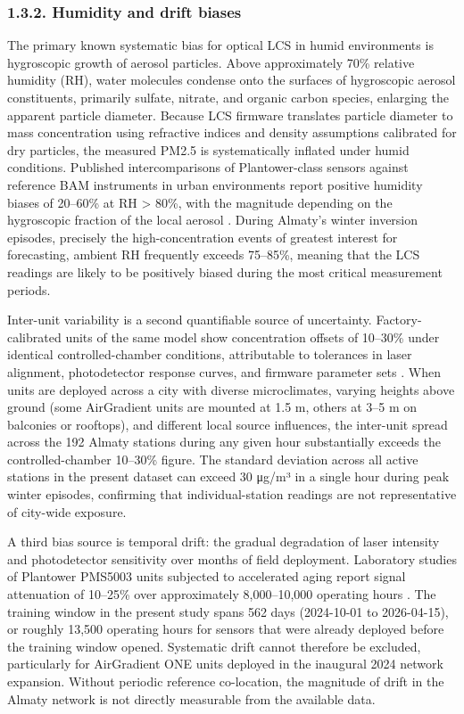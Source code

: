 \subsubsection{1.3.2. Humidity and drift biases}\label{humidity-and-drift-biases}

The primary known systematic bias for optical LCS in humid environments is hygroscopic growth of aerosol particles. Above approximately 70\% relative humidity (RH), water molecules condense onto the surfaces of hygroscopic aerosol constituents, primarily sulfate, nitrate, and organic carbon species, enlarging the apparent particle diameter. Because LCS firmware translates particle diameter to mass concentration using refractive indices and density assumptions calibrated for dry particles, the measured PM2.5 is systematically inflated under humid conditions. Published intercomparisons of Plantower-class sensors against reference BAM instruments in urban environments report positive humidity biases of 20--60\% at RH \textgreater{} 80\%, with the magnitude depending on the hygroscopic fraction of the local aerosol \cite{DiAntonio2018humidity} \cite{Kosmopoulos2020}. During Almaty's winter inversion episodes, precisely the high-concentration events of greatest interest for forecasting, ambient RH frequently exceeds 75--85\%, meaning that the LCS readings are likely to be positively biased during the most critical measurement periods.

Inter-unit variability is a second quantifiable source of uncertainty. Factory-calibrated units of the same model show concentration offsets of 10--30\% under identical controlled-chamber conditions, attributable to tolerances in laser alignment, photodetector response curves, and firmware parameter sets \cite{Popoola2016electrochemical}. When units are deployed across a city with diverse microclimates, varying heights above ground (some AirGradient units are mounted at 1.5 m, others at 3--5 m on balconies or rooftops), and different local source influences, the inter-unit spread across the 192 Almaty stations during any given hour substantially exceeds the controlled-chamber 10--30\% figure. The standard deviation across all active stations in the present dataset can exceed 30 μg/m³ in a single hour during peak winter episodes, confirming that individual-station readings are not representative of city-wide exposure.

A third bias source is temporal drift: the gradual degradation of laser intensity and photodetector sensitivity over months of field deployment. Laboratory studies of Plantower PMS5003 units subjected to accelerated aging report signal attenuation of 10--25\% over approximately 8,000--10,000 operating hours \cite{Sayahi2019}. The training window in the present study spans 562 days (2024-10-01 to 2026-04-15), or roughly 13,500 operating hours for sensors that were already deployed before the training window opened. Systematic drift cannot therefore be excluded, particularly for AirGradient ONE units deployed in the inaugural 2024 network expansion. Without periodic reference co-location, the magnitude of drift in the Almaty network is not directly measurable from the available data.

